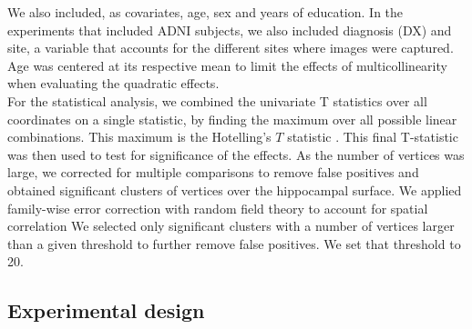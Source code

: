 \begin{table}[htbp]
\centering
{}
\caption[APOE allele pair counts.]{APOE allele pair counts for the studied cohorts. HE: heterozygotes. HO: homozygotes.}\label{table:apoeallele}
\end{table}

We also included, as covariates, age, sex and years of education. In the experiments that included ADNI subjects, we also included diagnosis (DX) and site, a variable that accounts for the different sites where images were captured. Age was centered at its respective mean to limit the effects of multicollinearity when evaluating the quadratic effects. \\

For the statistical analysis, we combined the univariate T statistics over all coordinates on a single statistic, by finding the maximum over all possible linear combinations. This maximum is the Hotelling's $T$ statistic \cite{Hotelling2007}. This final T-statistic was then used to test for significance of the effects. As the number of vertices was large, we corrected for multiple comparisons to remove false positives and obtained significant clusters of vertices over the hippocampal surface. We applied family-wise error correction with random field theory to account for spatial correlation \cite{Hayasaka2004} We selected only significant clusters with a number of vertices larger than a given threshold to further remove false positives. We set that threshold to 20. \\

\subsection{Experimental design}
\label{subsec:exp}

